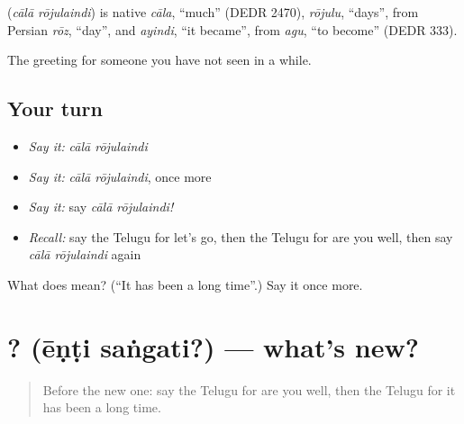 \begin{cousinweb}
\textbf{ } (\emph{cālā rōjulaindi}) is native \emph{cāla}, \textquotedblleft{}much\textquotedblright{} (DEDR 2470), \emph{rōjulu}, \textquotedblleft{}days\textquotedblright{}, from Persian \emph{rōz}, \textquotedblleft{}day\textquotedblright{}, and \emph{ayindi}, \textquotedblleft{}it became\textquotedblright{}, from \emph{agu}, \textquotedblleft{}to become\textquotedblright{} (DEDR 333).
\end{cousinweb}

\begin{grammarlens}[title={What you've built}]
The greeting for someone you have not seen in a while.
\end{grammarlens}

\subsection*{Your turn}
\begin{itemize}
\raggedright
  \item \emph{Say it:} \emph{cālā rōjulaindi}
  \item \emph{Say it:} \emph{cālā rōjulaindi}, once more
  \item \emph{Say it:} say \emph{cālā rōjulaindi!}
  \item \emph{Recall:} say the Telugu for let's go, then the Telugu for are you well, then say \emph{cālā rōjulaindi} again
\end{itemize}

\begin{tcolorbox}[breakable,colback=teal!4,colframe=teal!35!black,title={Before you move on}]
What does   mean? (\textquotedblleft{}It has been a long time\textquotedblright{}.) Say it once more.
\end{tcolorbox}
\section[\texorpdfstring{\te{ఏంటి} \te{సంగతి}? (ēṇṭi saṅgati?)}{ఏంటి సంగతి? (ēṇṭi saṅgati?)}]{ ? (ēṇṭi saṅgati?) — what's new?}

\label{lesson:TE-C91-whatsnew}



\begin{quote}
Before the new one: say the Telugu for are you well, then the Telugu for it has been a long time.
\end{quote}

